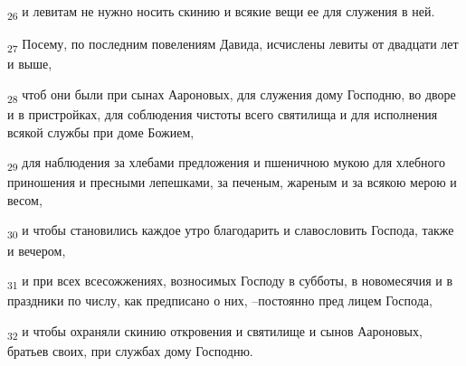 \begin{tcolorbox}
\textsubscript{26} и левитам не нужно носить скинию и всякие вещи ее для служения в ней.
\end{tcolorbox}
\begin{tcolorbox}
\textsubscript{27} Посему, по последним повелениям Давида, исчислены левиты от двадцати лет и выше,
\end{tcolorbox}
\begin{tcolorbox}
\textsubscript{28} чтоб они были при сынах Аароновых, для служения дому Господню, во дворе и в пристройках, для соблюдения чистоты всего святилища и для исполнения всякой службы при доме Божием,
\end{tcolorbox}
\begin{tcolorbox}
\textsubscript{29} для наблюдения за хлебами предложения и пшеничною мукою для хлебного приношения и пресными лепешками, за печеным, жареным и за всякою мерою и весом,
\end{tcolorbox}
\begin{tcolorbox}
\textsubscript{30} и чтобы становились каждое утро благодарить и славословить Господа, также и вечером,
\end{tcolorbox}
\begin{tcolorbox}
\textsubscript{31} и при всех всесожжениях, возносимых Господу в субботы, в новомесячия и в праздники по числу, как предписано о них, --постоянно пред лицем Господа,
\end{tcolorbox}
\begin{tcolorbox}
\textsubscript{32} и чтобы охраняли скинию откровения и святилище и сынов Аароновых, братьев своих, при службах дому Господню.
\end{tcolorbox}
